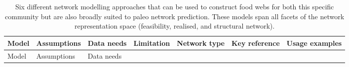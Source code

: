 \documentclass[
]{article}
\begin{document}
\begin{longtable}[]{@{}
  >{\raggedright\arraybackslash}p{}
  >{\raggedright\arraybackslash}p{}
  >{\raggedright\arraybackslash}p{}
  >{\raggedright\arraybackslash}p{}
  >{\raggedright\arraybackslash}p{}
  >{\raggedright\arraybackslash}p{}
  >{\raggedright\arraybackslash}p{}@{}}
\caption{Six different network modelling approaches that can be used to
construct food webs for both this specific community but are also
broadly suited to paleo network prediction. These models span all facets
of the network representation space (feasibility, realised, and
structural network).}\label{tbl-models}\tabularnewline
\toprule\noalign{}
\begin{minipage}[b]{\linewidth}\raggedright
Model
\end{minipage} & \begin{minipage}[b]{\linewidth}\raggedright
Assumptions
\end{minipage} & \begin{minipage}[b]{\linewidth}\raggedright
Data needs
\end{minipage} & \begin{minipage}[b]{\linewidth}\raggedright
Limitation
\end{minipage} & \begin{minipage}[b]{\linewidth}\raggedright
Network type
\end{minipage} & \begin{minipage}[b]{\linewidth}\raggedright
Key reference
\end{minipage} & \begin{minipage}[b]{\linewidth}\raggedright
Usage examples
\end{minipage} \\
\midrule\noalign{}
\endfirsthead
\toprule\noalign{}
\begin{minipage}[b]{\linewidth}\raggedright
Model
\end{minipage} & \begin{minipage}[b]{\linewidth}\raggedright
Assumptions
\end{minipage} & \begin{minipage}[b]{\linewidth}\raggedright
Data needs
\end{minipage} & \begin{minipage}[b]{\linewidth}\raggedright

\end{minipage}
\end{longtable}
\end{document}
